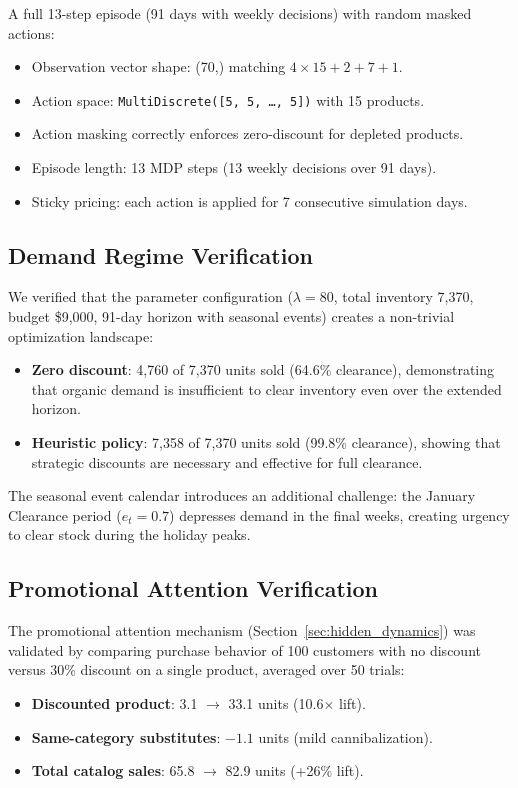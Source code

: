 \documentclass[11pt,a4paper]{article}
\begin{document}
A full 13-step episode (91 days with weekly decisions) with random masked actions:
\begin{itemize}
    \item Observation vector shape: (70,) matching $4 \times 15 + 2 + 7 + 1$.
    \item Action space: \texttt{MultiDiscrete([5, 5, \ldots, 5])} with 15 products.
    \item Action masking correctly enforces zero-discount for depleted products.
    \item Episode length: 13 MDP steps (13 weekly decisions over 91 days).
    \item Sticky pricing: each action is applied for 7 consecutive simulation days.
\end{itemize}

\subsection{Demand Regime Verification}

We verified that the parameter configuration ($\lambda = 80$, total inventory 7,370, budget \$9,000, 91-day horizon with seasonal events) creates a non-trivial optimization landscape:
\begin{itemize}
    \item \textbf{Zero discount}: 4,760 of 7,370 units sold (64.6\% clearance), demonstrating that organic demand is insufficient to clear inventory even over the extended horizon.
    \item \textbf{Heuristic policy}: 7,358 of 7,370 units sold (99.8\% clearance), showing that strategic discounts are necessary and effective for full clearance.
\end{itemize}
The seasonal event calendar introduces an additional challenge: the January Clearance period ($e_t = 0.7$) depresses demand in the final weeks, creating urgency to clear stock during the holiday peaks.

\subsection{Promotional Attention Verification}

The promotional attention mechanism (Section~\ref{sec:hidden_dynamics}) was validated by comparing purchase behavior of 100 customers with no discount versus 30\% discount on a single product, averaged over 50 trials:
\begin{itemize}
    \item \textbf{Discounted product}: 3.1 $\rightarrow$ 33.1 units (10.6$\times$ lift).
    \item \textbf{Same-category substitutes}: $-1.1$ units (mild cannibalization).
    \item \textbf{Total catalog sales}: 65.8 $\rightarrow$ 82.9 units (+26\% lift).
\end{itemize}
\end{document}
